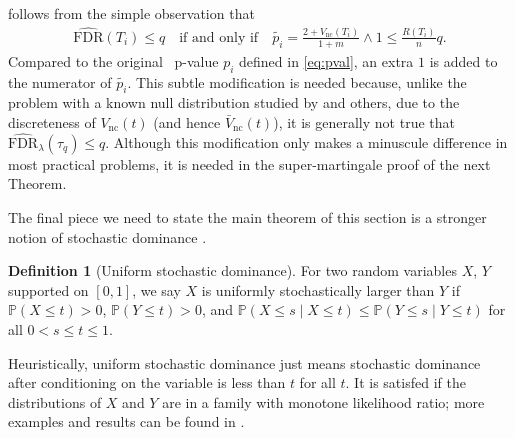 \documentclass[a4paper,11pt]{article}
\theoremstyle{plain}
\theoremstyle{definition}
\newtheorem{definition}{Definition}
\def\PP{\mathbb{P}}
\theoremstyle{plain}
\newcommand{\No}{{n}}
\newcommand{\NoNc}{m}
\newcommand{\pval}[1]{{p_{#1}}}
\newcommand{\testStatistics}[1]{{T_{#1}}}
\newcommand{\nickname}{{\text{RANC}}}
\newcommand{\FDR}{\text{FDR}}
\newcommand{\stoppingTime}{{\tau_q}}
\begin{document}
 follows from the simple observation that
\begin{align*}
    \widehat{\FDR}(\testStatistics{i}) \le q \quad \text{if and only
  if} \quad
    \tilde{\pval{i}} =
  \frac{2+V_{\text{nc}}(\testStatistics{i})}{1+\NoNc} \wedge 1 \le
  \frac{R(\testStatistics{i})}{\No} q.
\end{align*}
Compared to the original \nickname~p-value $p_i$ defined in
\eqref{eq:pval}, an extra $1$ is added to the numerator of
$\tilde{\pval{i}}$. This subtle modification is needed because, unlike
the problem with a known null distribution studied by
\textcite{storey2004strong} and others, due to the
discreteness of $V_{\text{nc}}(t)$ (and hence
$\bar{V}_{\text{nc}}(t)$), it
is generally not true that $\widehat{\FDR}_{\lambda}(\stoppingTime)
\leq q$. Although this modification only makes a
minuscule difference in most practical problems, it is needed in the
super-martingale proof of the next Theorem.

The final piece we need to state the main theorem of this section is a
stronger notion of stochastic dominance \parencite{zhao2019multiple}.
\begin{definition}[Uniform stochastic dominance]\label{defi:uniform.dominance}
    For two random variables $X$, $Y$ supported on $[0,1]$, we say $X$
    is uniformly stochastically larger than $Y$ if $\PP(X \le t) > 0$,
    $\PP(Y \le t) > 0$, and $\PP(X \le s \mid X \le t) \le \PP(Y \le s
    \mid Y \le t)$ for all $0 < s \leq t \leq 1$.
\end{definition}
Heuristically, uniform stochastic dominance just means stochastic
dominance after conditioning on the variable is less than $t$ for all
$t$. It is satisfed if the distributions of $X$ and $Y$ are in a family
with monotone likelihood ratio; more examples and results can be found
in \textcite{whitt1980uniform,zhao2019multiple}.
\end{document}
